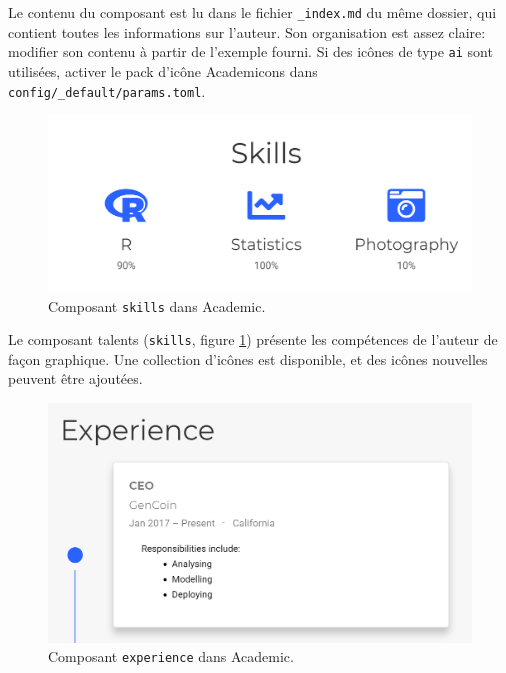 \documentclass[
  12pt,
  french,
  a4paper,
  extrafontsizes,onecolumn,openright
  ]{memoir}
\begin{document}
Le contenu du composant est lu dans le fichier \texttt{\_index.md} du même dossier, qui contient toutes les informations sur l'auteur.
Son organisation est assez claire: modifier son contenu à partir de l'exemple fourni.
Si des icônes de type \texttt{ai} sont utilisées, activer le pack d'icône Academicons dans \texttt{config/\_default/params.toml}.



\scriptsize

\begin{figure}

{\centering \includegraphics[width=0.8\linewidth]{images/rediger-skills} 

}

\caption{Composant \texttt{skills} dans Academic.}\label{fig:rediger-skills}
\end{figure}

\normalsize

Le composant talents (\texttt{skills}, figure \ref{fig:rediger-skills}) présente les compétences de l'auteur de façon graphique.
Une collection d'icônes est disponible, et des icônes nouvelles peuvent être ajoutées.



\scriptsize

\begin{figure}

{\centering \includegraphics[width=0.8\linewidth]{images/rediger-experience} 

}

\caption{Composant \texttt{experience} dans Academic.}\label{fig:rediger-experience}
\end{figure}
\end{document}
